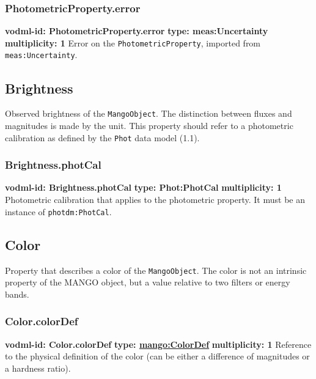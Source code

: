     \subsubsection{PhotometricProperty.error}
    \textbf{vodml-id: PhotometricProperty.error} \newline
    \textbf{type: meas:Uncertainty} \newline
    \textbf{multiplicity: 1} \newline
    Error on the \texttt{PhotometricProperty}, imported from \texttt{meas:Uncertainty}.

  \subsection{Brightness}
    \label{sect:Brightness}
    Observed brightness of the \texttt{MangoObject}. The distinction between fluxes and magnitudes is made by the unit. This property should refer to a photometric calibration as defined by the \texttt{Phot} data model (1.1).

    \subsubsection{Brightness.photCal}
    \textbf{vodml-id: Brightness.photCal} \newline
    \textbf{type: Phot:PhotCal} \newline
    \textbf{multiplicity: 1} \newline
    Photometric calibration that applies to the photometric property. It must be an instance of \texttt{photdm:PhotCal}.

  \subsection{Color}
    \label{sect:Color}
    Property that describes a color of the \texttt{MangoObject}. The color is not an intrinsic property of the MANGO object, but a value relative to two filters or energy bands.

    \subsubsection{Color.colorDef}
    \textbf{vodml-id: Color.colorDef} \newline
    \textbf{type: \hyperref[sect:ColorDef]{mango:ColorDef}} \newline
    \textbf{multiplicity: 1} \newline
    Reference to the physical definition of the color (can be either a difference of magnitudes or a hardness ratio).

